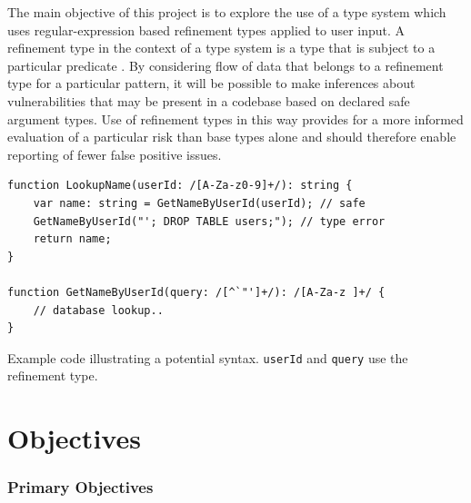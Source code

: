 \documentclass[a4paper,openany,12pt]{book}
\begin{document}
The main objective of this project is to explore the use of a type system which uses regular-expression based refinement
types applied to user input.
A refinement type in the context of a type system is a type that is subject to a particular predicate \citep[p.
207]{benjaminpierce2002}.
By considering flow of data that belongs to a refinement type for a particular pattern, it will be possible to make
inferences about vulnerabilities that may be present in a codebase based on declared safe argument types.
Use of refinement types in this way provides for a more informed evaluation of a particular risk than base types alone
and should therefore enable reporting of fewer false positive issues.

\begin{listing}[H]
    \begin{verbatim}
function LookupName(userId: /[A-Za-z0-9]+/): string {
    var name: string = GetNameByUserId(userId); // safe
    GetNameByUserId("'; DROP TABLE users;"); // type error
    return name;
}

function GetNameByUserId(query: /[^`"']+/): /[A-Za-z ]+/ {
    // database lookup..
}
    \end{verbatim}
    \caption{Example code illustrating a potential syntax. \texttt{userId} and \texttt{query} use the refinement type.}
\end{listing}
\section*{Objectives}



\subsubsection*{Primary Objectives}
\end{document}
